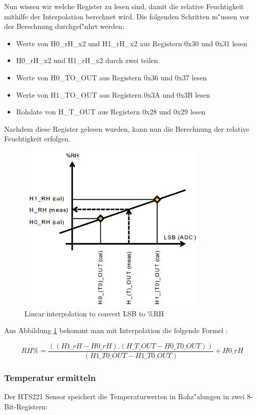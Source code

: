 Nun wissen wir welche Register zu lesen sind, damit die relative Feuchtigkeit mithilfe der Interpolation berechnet wird. Die folgenden Schritten m"ussen vor der Berechnung durchgef"uhrt werden:

\begin{itemize}
	\item Werte von H0\_rH\_x2 und H1\_rH\_x2 aus Registern 0x30 und 0x31 lesen 
	\item H0\_rH\_x2 und H1\_rH\_x2 durch zwei teilen
	\item Werte von H0\_TO\_OUT aus Registern 0x36 und 0x37 lesen 
	\item Werte von H1\_TO\_OUT aus Registern 0x3A und 0x3B lesen
	\item Rohdate von H\_T\_OUT aus Registern 0x28 und 0x29 lesen
\end{itemize}

Nachdem diese Register gelesen wurden, kann nun die Berechnung der relative Feuchtigkeit erfolgen.

\begin{figure}[h]
	\centering
	\includegraphics[width=9cm]{source/images/rH}
	\caption{Linear interpolation to convert LSB to \%RH \cite{HTS221}}\label{graph:rH}
\end{figure}

\vspace{3cm}
Aus Abbildung \ref{graph:rH} bekommt man mit Interpolation die folgende Formel \cite{HTS221}:

\begin{center}
	\[
	RH\% = \frac{((H1\_rH - H0\_rH) . (H\_T\_OUT - H0\_T0\_OUT))}{(H1\_T0\_OUT - H1\_T0\_OUT) } + H0\_rH  
	\]\label{HumFormel}
\end{center}


\subsubsection{Temperatur ermitteln}
Der HTS221 Sensor speichert die Temperaturwerten in Rohz"alungen in zwei 8-Bit-Registern:

